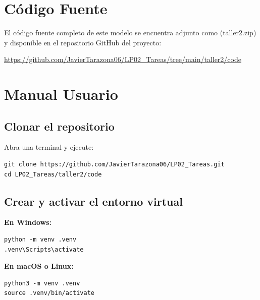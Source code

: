 \documentclass{article}
\begin{document}

\section{Código Fuente}\label{sec:cod}

El código fuente completo de este modelo se encuentra adjunto como 
(taller2.zip)
y disponible en el repositorio GitHub del proyecto:

\begin{center}
\url{https://github.com/JavierTarazona06/LP02_Tareas/tree/main/taller2/code}
\end{center}


\section{Manual Usuario}\label{sec:man_u}

\subsection{Clonar el repositorio}

Abra una terminal y ejecute:

\begin{verbatim}
git clone https://github.com/JavierTarazona06/LP02_Tareas.git
cd LP02_Tareas/taller2/code
\end{verbatim}

\subsection{Crear y activar el entorno virtual}

\textbf{En Windows:}
\begin{verbatim}
python -m venv .venv
.venv\Scripts\activate
\end{verbatim}

\textbf{En macOS o Linux:}
\begin{verbatim}
python3 -m venv .venv
source .venv/bin/activate
\end{verbatim}
\end{document}
